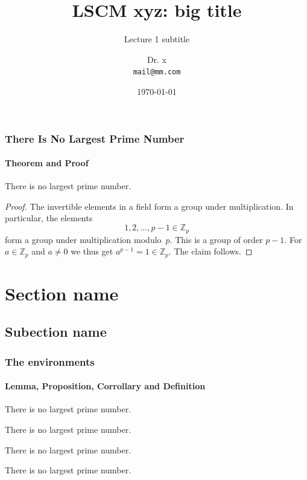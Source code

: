 \documentclass{beamer}
\title[Short title]{LSCM xyz:
big title}
\subtitle{Lecture 1 subtitle}
\date{\today}
\author{Dr. x\\
\texttt{mail@mm.com}}
\begin{document}
\begin{frame}[plain]
\titlepage
\end{frame}

\begin{frame}[t]
\frametitle{There Is No Largest Prime Number}
\framesubtitle{Theorem and Proof}

\begin{theorem}[Example]
There is no largest prime number. 
\end{theorem}

\begin{proof}
The invertible elements in a field form a group under multiplication.
In particular, the elements
\begin{equation*}
1, 2, \ldots, p - 1 \in \mathbb{Z}_p
\end{equation*}
form a group under multiplication modulo~\(p\).
This is a group of order \(p - 1\).
For \(a \in \mathbb{Z}_p\) and \(a \neq 0\) we thus get \(a^{p-1} = 1 \in \mathbb{Z}_p\).
The claim follows.
\end{proof}
\end{frame}

\section{Section name}
\subsection{Subection name}

\begin{frame}[t]
\frametitle{The environments}
\framesubtitle{Lemma, Proposition, Corrollary and Definition}

\begin{lemma}
There is no largest prime number.
\end{lemma}

\begin{proposition}
There is no largest prime number.
\end{proposition}

\begin{corrollary}
There is no largest prime number.
\end{corrollary}
\begin{definition}
There is no largest prime number.
\end{definition}
\end{frame}
\end{document}
